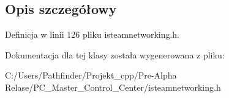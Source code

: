 \subsection{Opis szczegółowy}


Definicja w linii 126 pliku isteamnetworking.\+h.



Dokumentacja dla tej klasy została wygenerowana z pliku\+:\begin{DoxyCompactItemize}
\item 
C\+:/\+Users/\+Pathfinder/\+Projekt\+\_\+cpp/\+Pre-\/\+Alpha Relase/\+P\+C\+\_\+\+Master\+\_\+\+Control\+\_\+\+Center/isteamnetworking.\+h\end{DoxyCompactItemize}
